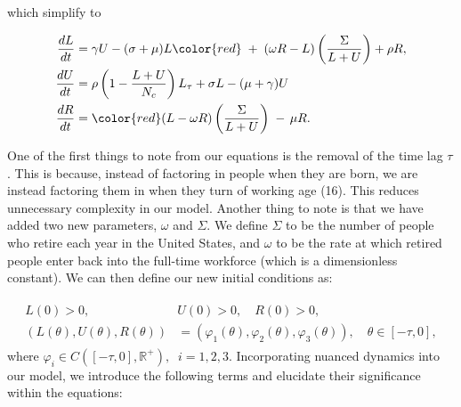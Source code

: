 \documentclass[11pt]{amsart}
\begin{document}
which simplify to 

\begin{align}
    \begin{split}
        \frac{dL}{dt} &= \gamma U - (\sigma + \mu)L {\color{red}\; + \;(\omega R - L)\left(\frac{\Sigma}{L + U}\right) + \rho R},\\
        \frac{dU}{dt} &= \rho\left(1 - \frac{L + U}{N_c} \right)L_{\tau} + \sigma L -(\mu + \gamma)U  \\
        \frac{dR}{dt} &= {\color{red}(L - \omega R)\left(\frac{\Sigma}{L + U}\right) \; - \, \mu R}.
    \end{split}
\end{align}

One of the first things to note from our equations is the removal of the time lag $\tau$. 
This is because, instead of factoring in people when they are born, we are instead factoring them
in when they turn of working age (16). This reduces unnecessary complexity in our model. Another thing to note
is that we have added two new parameters, $\omega$ and $\Sigma$. We define $\Sigma$ to be the number of people who
retire each year in the United States, and $\omega$ to be the rate at which retired people enter back
into the full-time workforce (which is a dimensionless constant). We can then define our new initial conditions as:

\begin{align}
    \begin{split}
        L(0) > 0, \quad &U(0) > 0, \quad R(0) > 0, \\
        (L(\theta),U(\theta), R(\theta)) &= (\varphi_1(\theta), \varphi_2(\theta), \varphi_3(\theta)), \quad \theta \in [-\tau,0],
    \end{split}
\end{align}
where $\varphi_i\in C([-\tau, 0], \mathbb{R}^+),\;\; i=1,2,3$. Incorporating nuanced dynamics into our model, we introduce the following terms and elucidate their significance within the equations:

\end{document}
